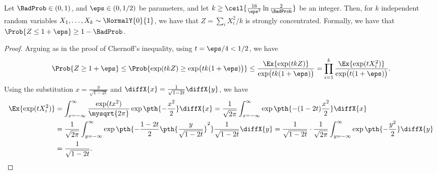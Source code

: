 \begin{lemma}
    Let $\BadProb \in (0,1)$, and $\eps \in (0,1/2)$ be parameters,
    and let
    $k \geq \ceil{\smash{\frac{16}{\eps^2} \ln
          \frac{2}{\BadProb}}\bigr.}\Bigr.$ be an integer. Then, for
    $k$ independent random variables
    $X_1, \ldots, X_k \sim \NormalY{0}{1}$, we have that
    $Z = \sum_i X_i^2/k$ is strongly concentrated. Formally, we have
    that $\Prob{ Z \leq 1+\eps} \geq 1 - \BadProb$.
\end{lemma}
\begin{proof}
    Arguing as in the proof of Chernoff's inequality, using
    $t=\eps/4<1/2$, we have
    \begin{equation*}
        \Prob{Z \geq 1+\eps}%
        \leq%
        \Prob{\exp(tkZ) \geq \exp\bigl( tk(1+\eps)\bigr)}
        \leq
        \frac{\Ex{\exp(tkZ)}}
        {{\exp\bigl( tk(1+\eps)\bigr)}}
        =%
        \prod_{i=1}^k \frac{\Ex{\exp( tX_i^2) }}
        {\exp\bigl( t(1+\eps)\bigr)}.
    \end{equation*}
    Using the substitution $x= \frac{y}{\sqrt{1-2t}}$ and
    $\diffX{x} = \frac{1}{\sqrt{1-2t}} \diffX{y}$, we have
    \begin{align*}
      \Ex{\exp( tX_i^2) }%
      &=%
        \int_{x=-\infty}^\infty \frac{\exp(tx^2)}{\mysqrt{2\pi}} \exp
        \pth{ -\frac{x^2}{2}} \diffX{x}%
      =%
      \frac{1}{\sqrt{2\pi}}
      \int_{x=-\infty}^\infty \exp
      \pth{ -(1-2t)\frac{x^2}{2}} \diffX{x}%
      \\&%
      =
      \frac{1}{\sqrt{2\pi}}
      \int_{y=-\infty}^{\infty}  \exp
      \pth{ -\frac{1-2t}{2}\pth{\frac{y}{\sqrt{1-2t}}}^2}
      \frac{1}{\sqrt{1-2t}}
      \diffX{y}%
      =
      \frac{1}{\sqrt{1-2t}}
      \cdot
      \frac{1}{\sqrt{2\pi}}
      \int_{y=-\infty}^{\infty}  \exp
      \pth{ -\frac{y^2}{2} }
      \diffX{y}%
      \\&
      =%
      \frac{1}{\sqrt{1-2t}}.
    \end{align*}


\end{proof}
